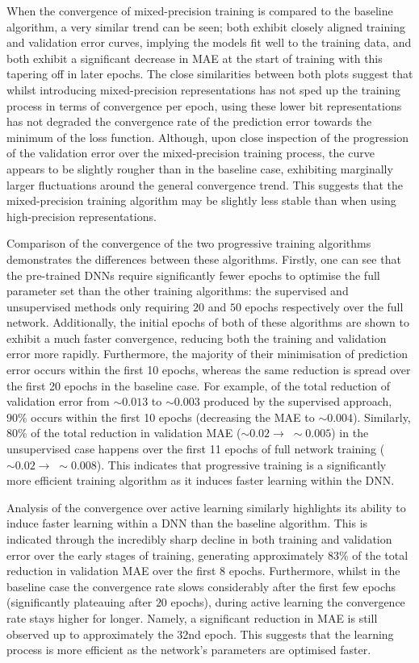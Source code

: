 \documentclass[a4paper, 11pt]{report}
\begin{document}
    When the convergence of mixed-precision training is compared to the baseline algorithm, a very similar trend can be seen; both exhibit closely aligned training and validation error curves, implying the models fit well to the training data, and both exhibit a significant decrease in MAE at the start of training with this tapering off in later epochs. The close similarities between both plots suggest that whilst introducing mixed-precision representations has not sped up the training process in terms of convergence per epoch, using these lower bit representations has not degraded the convergence rate of the prediction error towards the minimum of the loss function. Although, upon close inspection of the progression of the validation error over the mixed-precision training process, the curve appears to be slightly rougher than in the baseline case, exhibiting marginally larger fluctuations around the general convergence trend. This suggests that the mixed-precision training algorithm may be slightly less stable than when using high-precision representations.

    Comparison of the convergence of the two progressive training algorithms demonstrates the differences between these algorithms. Firstly, one can see that the pre-trained DNNs require significantly fewer epochs to optimise the full parameter set than the other training algorithms: the supervised and unsupervised methods only requiring $20$ and $50$ epochs respectively over the full network. Additionally, the initial epochs of both of these algorithms are shown to exhibit a much faster convergence, reducing both the training and validation error more rapidly. Furthermore, the majority of their minimisation of prediction error occurs within the first 10 epochs, whereas the same reduction is spread over the first 20 epochs in the baseline case. For example, of the total reduction of validation error from $\sim \! 0.013$ to $\sim \! 0.003$ produced by the supervised approach, $90\%$ occurs within the first 10 epochs (decreasing the MAE to $\sim \! 0.004$). Similarly, $80\%$ of the total reduction in validation MAE ($\sim \! 0.02 \to \; \sim \! 0.005$) in the unsupervised case happens over the first 11 epochs of full network training ($\sim \! 0.02 \to \; \sim \! 0.008$). This indicates that progressive training is a significantly more efficient training algorithm as it induces faster learning within the DNN.

    Analysis of the convergence over active learning similarly highlights its ability to induce faster learning within a DNN than the baseline algorithm. This is indicated through the incredibly sharp decline in both training and validation error over the early stages of training, generating approximately $83\%$ of the total reduction in validation MAE over the first $8$ epochs. Furthermore, whilst in the baseline case the convergence rate slows considerably after the first few epochs (significantly plateauing after $20$ epochs), during active learning the convergence rate stays higher for longer. Namely, a significant reduction in MAE is still observed up to approximately the 32nd epoch. This suggests that the learning process is more efficient as the network's parameters are optimised faster.
\end{document}
